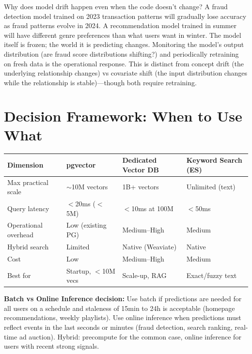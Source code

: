 \documentclass[11pt,a4paper]{article}
\begin{document}
\begin{thinkbox}
Why does model drift happen even when the code doesn't change? A fraud detection model trained on 2023 transaction patterns will gradually lose accuracy as fraud patterns evolve in 2024. A recommendation model trained in summer will have different genre preferences than what users want in winter. The model itself is frozen; the world it is predicting changes. Monitoring the model's output distribution (are fraud score distributions shifting?) and periodically retraining on fresh data is the operational response. This is distinct from concept drift (the underlying relationship changes) vs covariate shift (the input distribution changes while the relationship is stable)---though both require retraining.
\end{thinkbox}

\section{Decision Framework: When to Use What}

\begin{center}
\begin{tabular}{p{2.8cm}p{2.8cm}p{2.8cm}p{3.4cm}}
\toprule
\textbf{Dimension} & \textbf{pgvector} & \textbf{Dedicated Vector DB} & \textbf{Keyword Search (ES)} \\
\midrule
Max practical scale & $\sim$10M vectors & 1B+ vectors & Unlimited (text) \\
Query latency & $<$20ms ($<$5M) & $<$10ms at 100M & $<$50ms \\
Operational overhead & Low (existing PG) & Medium--High & Medium \\
Hybrid search & Limited & Native (Weaviate) & Native \\
Cost & Low & Medium--High & Medium \\
Best for & Startup, $<$10M vecs & Scale-up, RAG & Exact/fuzzy text \\
\bottomrule
\end{tabular}
\end{center}

\vspace{0.5em}

\textbf{Batch vs Online Inference decision:} Use batch if predictions are needed for all users on a schedule and staleness of 15min to 24h is acceptable (homepage recommendations, weekly playlists). Use online inference when predictions must reflect events in the last seconds or minutes (fraud detection, search ranking, real-time ad auction). Hybrid: precompute for the common case, online inference for users with recent strong signals.
\end{document}
